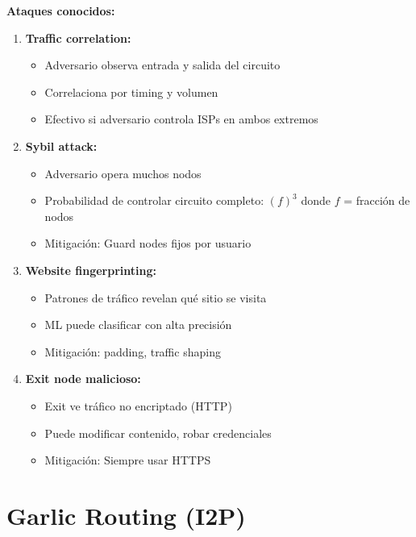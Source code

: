\documentclass[11pt,a4paper,twoside]{book}
\begin{document}
\begin{remark}
\textbf{Ataques conocidos:}

\begin{enumerate}
    \item \textbf{Traffic correlation:}
    \begin{itemize}
        \item Adversario observa entrada y salida del circuito
        \item Correlaciona por timing y volumen
        \item Efectivo si adversario controla ISPs en ambos extremos
    \end{itemize}
    
    \item \textbf{Sybil attack:}
    \begin{itemize}
        \item Adversario opera muchos nodos
        \item Probabilidad de controlar circuito completo: $(f)^3$ donde $f$ = fracci\'on de nodos
        \item Mitigaci\'on: Guard nodes fijos por usuario
    \end{itemize}
    
    \item \textbf{Website fingerprinting:}
    \begin{itemize}
        \item Patrones de tr\'afico revelan qu\'e sitio se visita
        \item ML puede clasificar con alta precisi\'on
        \item Mitigaci\'on: padding, traffic shaping
    \end{itemize}
    
    \item \textbf{Exit node malicioso:}
    \begin{itemize}
        \item Exit ve tr\'afico no encriptado (HTTP)
        \item Puede modificar contenido, robar credenciales
        \item Mitigaci\'on: Siempre usar HTTPS
    \end{itemize}
\end{enumerate}
\end{remark}

\section{Garlic Routing (I2P)}
\label{sec:garlic-routing}
\end{document}
